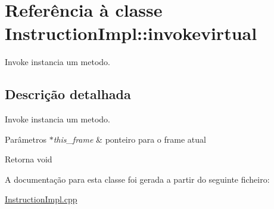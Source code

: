 \hypertarget{class_instruction_impl_1_1invokevirtual}{}\section{Referência à classe Instruction\+Impl\+:\+:invokevirtual}
\label{class_instruction_impl_1_1invokevirtual}


Invoke instancia um metodo.  




\subsection{Descrição detalhada}
Invoke instancia um metodo. 


\begin{DoxyParams}{Parâmetros}
{\em $\ast$this\+\_\+frame} & ponteiro para o frame atual \\
\hline
\end{DoxyParams}
\begin{DoxyReturn}{Retorna}
void 
\end{DoxyReturn}


A documentação para esta classe foi gerada a partir do seguinte ficheiro\+:\begin{DoxyCompactItemize}
\item 
\hyperlink{_instruction_impl_8cpp}{Instruction\+Impl.\+cpp}\end{DoxyCompactItemize}
